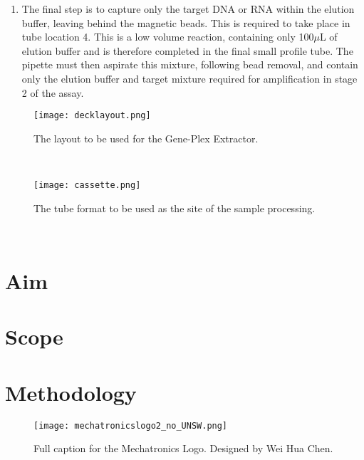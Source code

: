 \begin{enumerate}
	\item The final step is to capture only the target DNA or RNA within the elution buffer, leaving behind the magnetic beads. This is required to take place in tube location 4. This is a low volume reaction, containing only 100$\mu$L of elution buffer and is therefore completed in the final small profile tube. The pipette must then aspirate this mixture, following bead removal, and contain only the elution buffer and target mixture required for amplification in stage 2 of the assay.
\end{enumerate}

\begin{figure}
	\centering
	\texttt{[image: decklayout.png]}
	\caption[Extractor deck layout.]{The layout to be used for the Gene-Plex Extractor.}
	\label{fig:decklayout}
\end{figure} 

\begin{figure}
	\centering
	\texttt{[image: cassette.png]}
	\caption[Extraction cassette tubes.]{The tube format to be used as the site of the sample processing.}
	\label{fig:cassette}
\end{figure} 


\section{Aim}
\label{sec:intro_aim}

\section{Scope}
\label{sec:intro_scope}

\section{Methodology}
\label{sec:intro_method}




\begin{figure}
\centering
\texttt{[image: mechatronicslogo2\_no\_UNSW.png]}
\caption[Short caption for list of figures.]{Full caption for the Mechatronics Logo. Designed by Wei Hua Chen.}
\label{fig:intro_logo}
\end{figure}

